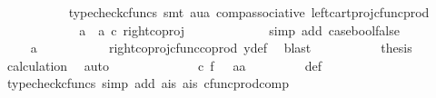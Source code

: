 \begin{isabellebody}
\ \ \ \ \ \ \ \ \ \isamarkupfalse%
\ {\isacharparenleft}{\kern0pt}typecheck{\isacharunderscore}{\kern0pt}cfuncs{\isacharcomma}{\kern0pt}\ smt\ aua\ comp{\isacharunderscore}{\kern0pt}associative{}\ left{\isacharunderscore}{\kern0pt}cart{\isacharunderscore}{\kern0pt}proj{\isacharunderscore}{\kern0pt}cfunc{\isacharunderscore}{\kern0pt}prod{\isacharparenright}{\kern0pt}\isanewline
\ \ \ \ \ \ \ \isamarkupfalse%
\ \isamarkupfalse%
\ {\isachardoublequoteopen}{\isachardot}{\kern0pt}{\isachardot}{\kern0pt}{\isachardot}{\kern0pt}\ {\isacharequal}{\kern0pt}\ {\isacharparenleft}{\kern0pt}a{}\ {\isasymamalg}\ a{}{\isacharparenright}{\kern0pt}\ {\isasymcirc}\isactrlsub c\ right{\isacharunderscore}{\kern0pt}coproj\ {\isasymone}\ {\isasymone}{\isachardoublequoteclose}\isanewline
\ \ \ \ \ \ \ \ \ \isamarkupfalse%
\ {\isacharparenleft}{\kern0pt}simp\ add{\isacharcolon}{\kern0pt}\ case{\isacharunderscore}{\kern0pt}bool{\isacharunderscore}{\kern0pt}false{\isacharparenright}{\kern0pt}\isanewline
\ \ \ \ \ \ \ \isamarkupfalse%
\ \isamarkupfalse%
\ {\isachardoublequoteopen}{\isachardot}{\kern0pt}{\isachardot}{\kern0pt}{\isachardot}{\kern0pt}\ {\isacharequal}{\kern0pt}\ a{}{\isachardoublequoteclose}\isanewline
\ \ \ \ \ \ \ \ \ \isamarkupfalse%
\ right{\isacharunderscore}{\kern0pt}coproj{\isacharunderscore}{\kern0pt}cfunc{\isacharunderscore}{\kern0pt}coprod\ y{\isacharunderscore}{\kern0pt}def\ \isamarkupfalse%
\ blast\isanewline
\ \ \ \ \ \ \ \isamarkupfalse%
\ \isamarkupfalse%
\ {\isacharquery}{\kern0pt}thesis\ \isamarkupfalse%
\ calculation\ \isamarkupfalse%
\ auto\isanewline
\ \ \ \ \ \isamarkupfalse%
\isanewline
\ \ \ \ \ \isamarkupfalse%
\ {\isachardoublequoteopen}{\isasymphi}\ {\isasymcirc}\isactrlsub c\ f\ \ {\isacharequal}{\kern0pt}\ {\isasymlangle}a{}{\isacharcomma}{\kern0pt}a{}{\isasymrangle}{\isachardoublequoteclose}\isanewline
\ \ \ \ \ \ \ \isamarkupfalse%
\ {\isasymphi}{\isacharunderscore}{\kern0pt}def\ \isamarkupfalse%
\ {\isacharparenleft}{\kern0pt}typecheck{\isacharunderscore}{\kern0pt}cfuncs{\isacharcomma}{\kern0pt}\ simp\ add{\isacharcolon}{\kern0pt}\ a{}{\isacharunderscore}{\kern0pt}is\ a{}{\isacharunderscore}{\kern0pt}is\ cfunc{\isacharunderscore}{\kern0pt}prod{\isacharunderscore}{\kern0pt}comp{\isacharparenright}{\kern0pt}\isanewline

\end{isabellebody}
